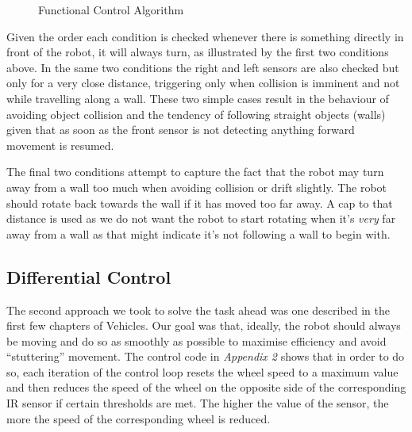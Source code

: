 \documentclass[paper=a4, fontsize=12pt]{scrartcl}	%
\numberwithin{equation}{section}		%
\numberwithin{figure}{section}			%
\numberwithin{table}{section}				%
\begin{document}
\begin{figure}[!ht]
\begin{framed}
\begin{algorithmic}
 \ENDIF
 \ENDIF
 \ENDIF
 \ENDIF
\end{algorithmic}
\end{framed}
\caption{Functional Control Algorithm}
\end{figure}

Given the order each condition is checked whenever there is something directly in front of the robot, it will always turn, as illustrated by the first two conditions above. In the same two conditions the right and left sensors are also checked but only for a very close distance, triggering only when collision is imminent and not while travelling along a wall. These two simple cases result in the behaviour of avoiding object collision and the tendency of following straight objects (walls) given that as soon as the front sensor is not detecting anything forward movement is resumed.

The final two conditions attempt to capture the fact that the robot may turn away from a wall too much when avoiding collision or drift slightly. The robot should rotate back towards the wall if it has moved too far away. A cap to that distance is used as we do not want the robot to start rotating when it's \emph{very} far away from a wall as that might indicate it's not following a wall to begin with.
\subsection{Differential Control}
The second approach we took to solve the task ahead was one described in the first few chapters of Vehicles\cite{vehicles}. Our goal was that, ideally, the robot should always be moving and do so as smoothly as possible to maximise efficiency and avoid ``stuttering'' movement. The control code in \emph{Appendix 2} shows that in order to do so, each iteration of the control loop resets the wheel speed to a maximum value and then reduces the speed of the wheel on the opposite side of the corresponding IR sensor if certain thresholds are met. The higher the value of the sensor, the more the speed of the corresponding wheel is reduced.
\end{document}
